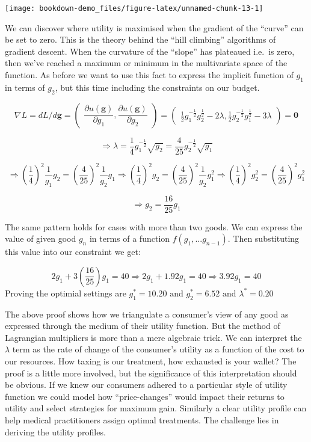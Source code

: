 \documentclass[]{tufte-book}
\theoremstyle{definition}
\theoremstyle{definition}
\theoremstyle{definition}
\theoremstyle{remark}
\begin{document}
\texttt{[image: bookdown-demo\_files/figure-latex/unnamed-chunk-13-1]}

We can discover where utility is maximised when the gradient of the ``curve'' can be set to zero. This is the theory behind the ``hill climbing'' algorithms of gradient descent. When the curvature of the ``slope'' has plateaued i.e.~is zero, then we've reached a maximum or minimum in the multivariate space of the function. As before we want to use this fact to express the implicit function of \(g_{1}\) in terms of \(g_{2}\), but this time including the constraints on our budget.

\[
\nabla L = dL /  d\mathbf{g} =
    \begin{pmatrix}
       \dfrac{\partial u(\mathbf{g})}{\partial g_1} , \dfrac{\partial u(\mathbf{g})}{\partial g_2}
    \end{pmatrix} = \begin{pmatrix}
    \frac{1}{2}g_{1}^{-\frac{1}{2}}g_{2}^{\frac{1}{2} } - 2\lambda ,
    \frac{1}{2}g_{2}^{-\frac{1}{2}}g_{1}^{\frac{1}{2} } - 3\lambda
    \end{pmatrix} = \mathbf{0}
\]

\[ \Rightarrow \lambda = \frac{1}{4}g_{1}^{-\frac{1}{2}}\sqrt{g_{2}} = \frac{4}{25}g_{2}^{-\frac{1}{2}}\sqrt{g_{1}}\]

\[ \Rightarrow  (\frac{1}{4})^2\frac{1}{g_{1}}g_{2} = (\frac{4}{25})^2\frac{1}{g_{2}}g_{1} \Rightarrow (\frac{1}{4})^2 g_{2} = (\frac{4}{25})^2\frac{1}{g_{2}}g_{1}^2  \Rightarrow (\frac{1}{4})^2g_{2}^{2} = (\frac{4}{25})^2g_{1}^2 \]

\[ \Rightarrow g_{2} = \frac{16}{25}g_{1}\]

The same pattern holds for cases with more than two goods. We can express the value of given good \(g_n\) in terms of a function \(f(g_{1}, ... g_{n-1})\). Then substituting this value into our constraint we get:

\[ 2g_{1} + 3(\frac{16}{25})g_{1} = 40 \Rightarrow 2g_{1} + 1.92g_{1} = 40 \Rightarrow 3.92g_{1} = 40\] Proving the optimial settings are \(g_{1}^{*} = 10.20 \text{ and } g_{2}^{*} = 6.52 \text{ and } \lambda^{*} = 0.20\)

The above proof shows how we triangulate a consumer's view of any good as expressed through the medium of their utility function. But the method of Lagrangian multipliers is more than a mere algebraic trick. We can interpret the \(\lambda\) term as the rate of change of the consumer's utility as a function of the cost to our resources. How taxing is our treatment, how exhausted is your wallet? The proof is a little more involved, but the significance of this interpretation should be obvious. If we knew our consumers adhered to a particular style of utility function we could model how ``price-changes'' would impact their returns to utility and select strategies for maximum gain. Similarly a clear utility profile can help medical practitioners assign optimal treatments. The challenge lies in deriving the utility profiles.
\end{document}
